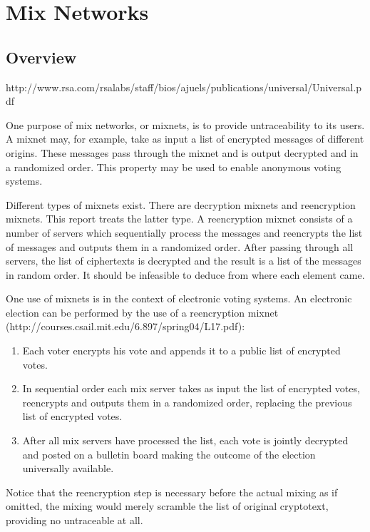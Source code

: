 \section{Mix Networks}

\subsection{Overview}
http://www.rsa.com/rsalabs/staff/bios/ajuels/publications/universal/Universal.pdf

One purpose of mix networks, or mixnets, is to provide untraceability
to its users. A mixnet may, for example, take as input a list of
encrypted messages of different origins. These messages pass through
the mixnet and is output decrypted and in a randomized order. This
property may be used to enable anonymous voting systems.

Different types of mixnets exist. There are decryption mixnets and
reencryption mixnets. This report treats the latter type. A
reencryption mixnet consists of a number of servers which sequentially
process the messages and reencrypts the list of messages and outputs
them in a randomized order. After passing through all servers, the
list of ciphertexts is decrypted and the result is a list of the
messages in random order. It should be infeasible to deduce from where
each element came.

One use of mixnets is in the context of electronic voting systems. An
electronic election can be performed by the use of a reencryption
mixnet \\
(http://courses.csail.mit.edu/6.897/spring04/L17.pdf):
\begin{enumerate}
\item Each voter encrypts his vote and appends it to a public list of
  encrypted votes.
\item In sequential order each mix server takes as input the list of
  encrypted votes, reencrypts and outputs them in a randomized order,
  replacing the previous list of encrypted votes.
\item After all mix servers have processed the list, each vote is
  jointly decrypted and posted on a bulletin board making the outcome
  of the election universally available.
\end{enumerate}

Notice that the reencryption step is necessary before the actual
mixing as if omitted, the mixing would merely scramble the list of
original cryptotext, providing no untraceable at all.

